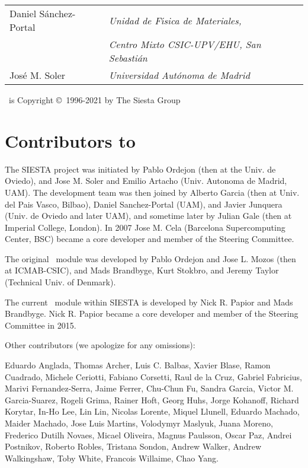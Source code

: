 \begin{titlepage}
\begin{center}
\begin{tabular}{ll}
  Daniel S\'anchez-Portal &
  \textit{Unidad de F\'{\i}sica de Materiales,} \\
  &
  \textit{Centro Mixto CSIC-UPV/EHU, San Sebasti\'an} \\
  
  Jos\'e M. Soler &
  \textit{Universidad Aut\'onoma de Madrid} \\
   
\end{tabular}
 
\vspace{0.5cm}

\siesta\ is Copyright \copyright\ 1996-2021 by The Siesta Group

\end{center}

\end{titlepage}


\newpage

\section*{Contributors to \siesta}

The SIESTA project was initiated by Pablo Ordejon (then at the Univ. de
Oviedo), and Jose M. Soler and Emilio Artacho (Univ. Autonoma de Madrid,
UAM).  The development team was then joined by Alberto Garcia (then at
Univ. del Pais Vasco, Bilbao), Daniel Sanchez-Portal (UAM), and
Javier Junquera (Univ. de Oviedo and later UAM), and sometime later by
Julian Gale (then at Imperial College, London). In 2007 Jose M. Cela
(Barcelona Supercomputing Center, BSC) became a core developer and
member of the Steering Committee.

The original \tsiesta\ module was developed by
Pablo Ordejon and Jose L. Mozos (then at ICMAB-CSIC), and Mads Brandbyge,
Kurt Stokbro, and Jeremy Taylor (Technical Univ. of Denmark).

The current \tsiesta\ module within SIESTA is developed by 
Nick R. Papior and Mads Brandbyge. Nick R. Papior became a core
developer and member of the Steering Committee in 2015.

Other contributors (we apologize for any omissions):

Eduardo Anglada,
Thomas Archer,
Luis C. Balbas,
Xavier Blase,
Ramon Cuadrado,
Michele Ceriotti,
Fabiano Corsetti,
Raul de la Cruz,
Gabriel Fabricius,
Marivi Fernandez-Serra,
Jaime Ferrer,
Chu-Chun Fu,
Sandra Garcia,
Victor M. Garcia-Suarez,
Rogeli Grima,
Rainer Hoft,
Georg Huhs,
Jorge Kohanoff,
Richard Korytar,
In-Ho Lee,
Lin Lin,
Nicolas Lorente,
Miquel Llunell,
Eduardo Machado,
Maider Machado,
Jose Luis Martins,
Volodymyr Maslyuk,
Juana Moreno,
Frederico Dutilh Novaes, 
Micael Oliveira,
Magnus Paulsson,
Oscar Paz,
Andrei Postnikov,
Roberto Robles,
Tristana Sondon,
Andrew Walker,
Andrew Walkingshaw,
Toby White,
Francois Willaime,
Chao Yang.

